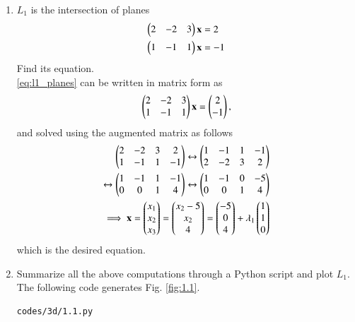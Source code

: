 \renewcommand{\theequation}{\theenumi}
\begin{enumerate}[label=\arabic*.,ref=\thesubsection.\theenumi]
\item  $L_1$ is the intersection of planes 
\begin{align}
\begin{split}
\begin{pmatrix}2 & -2 & 3\end{pmatrix}\mathbf{x} &= 2
\\
\begin{pmatrix}1 & -1 & 1\end{pmatrix}\mathbf{x} &= -1
\end{split}
\label{eq:l1_planes}
\end{align}
%
Find its equation.
\\
\solution \eqref{eq:l1_planes} can be written in matrix form as
\begin{align}
\begin{pmatrix}2 & -2 & 3 \\ 1 & -1 & 1\end{pmatrix}\mathbf{x} = \begin{pmatrix}2 \\ -1\end{pmatrix},
\end{align}
%
and solved using the augmented matrix as follows
\begin{align}
\begin{pmatrix}2 & -2 & 3 & 2\\ 1 & -1 & 1 & -1\end{pmatrix} \leftrightarrow \begin{pmatrix} 1 & -1 & 1 & -1 \\ 2 & -2 & 3 & 2\end{pmatrix}
\\
\leftrightarrow \begin{pmatrix} 1 & -1 & 1 & -1 \\ 0 & 0 & 1 & 4\end{pmatrix} \leftrightarrow \begin{pmatrix} 1 & -1 & 0 & -5 \\ 0 & 0 & 1 
& 4\end{pmatrix}
\\
\implies \mathbf{x} = \begin{pmatrix} x_1 \\ x_2 \\ x_3\end{pmatrix} = \begin{pmatrix} x_2-5 \\ x_2 \\ 4\end{pmatrix} = \begin{pmatrix} 
-5 \\ 0 \\ 4\end{pmatrix} + \lambda_1 \begin{pmatrix} 1 \\ 1 \\ 0\end{pmatrix}
\label{eq:l1}
\end{align}
%
which is the desired equation.
\item Summarize all the above computations through a Python script and plot 
$L_1$.
\\
\solution The following code generates Fig. \ref{fig:1.1}.
\begin{lstlisting}
codes/3d/1.1.py
\end{lstlisting}
\begin{figure}[!ht]
\centering

\end{figure}
\end{enumerate}
